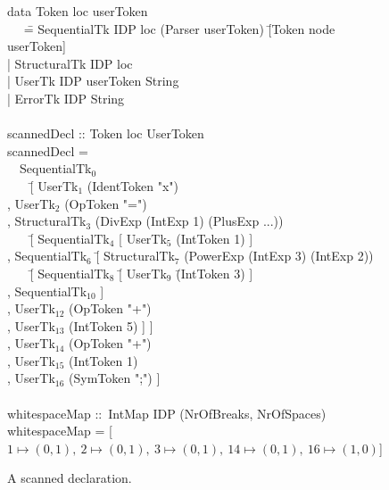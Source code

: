 \documentclass[12pt]{article}
\begin{document}
\begin{figure}
\begin{footnotesize}
\begin{tabbedCode}
data Token loc userToken \\
~~ \= = SequentialTk    IDP loc (Parser userToken) \= [Token node userToken]\\
   \> | StructuralTk IDP loc                    \\
   \> | UserTk       IDP userToken String \\
   \> | ErrorTk      IDP String \\
\\
scannedDecl :: Token loc UserToken\\
scannedDecl = \\
~~SequentialTk$_0$ \= \\
~~~ \= [ UserTk$_1$ (IdentToken "x") \\
   \> , UserTk$_2$ (OpToken "=") \\
   \> , StructuralTk$_3$ (DivExp (IntExp 1) (PlusExp ...))\\
   \> ~~~ \= [ SequentialTk$_4$ [ UserTk$_5$ (IntToken 1) ] \\
   \>      \> , SequentialTk$_6$ \= [ StructuralTk$_7$ (PowerExp (IntExp 3) (IntExp 2))\\
   \>      \>              \> ~~~ \= [ SequentialTk$_8$    \= [ UserTk$_9$ \= (IntToken 3) ] \\
   \>      \>              \>      \> , SequentialTk$_{10}$  ]\\
   \>      \>              \> , UserTk$_{12}$ (OpToken "+") \\
   \>      \>              \> , UserTk$_{13}$ (IntToken 5) ] ] \\
   \> , UserTk$_{14}$ (OpToken "+") \\
   \> , UserTk$_{15}$ (IntToken 1) \\
   \> , UserTk$_{16}$ (SymToken ";") ]\\
\\
whitespaceMap ::~IntMap IDP (NrOfBreaks, NrOfSpaces)\\
whitespaceMap = [$1 \mapsto (0,1),~2 \mapsto (0,1),~3 \mapsto (0,1),~14 \mapsto (0,1),~16 \mapsto (1,0)$]
\end{tabbedCode}
\end{footnotesize}
\caption{A scanned declaration.} \label{fig:scanResult} 
\end{figure}
\end{document}
